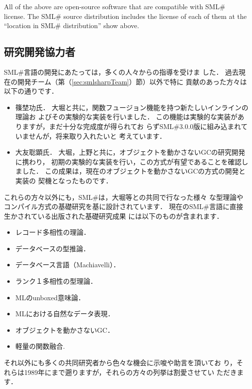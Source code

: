 \documentclass{jbook}
\newif\ifjp
\newcommand{\txt}[2]{#1}
\newcommand{\smlsharp}{SML\#}
\newcommand{\version}{3.0.0}
\begin{document}
	All of the above are open-source software that are compatible
with \smlsharp{} license.
	The \smlsharp{} source distribution includes the license of each
of them at the ``location in \smlsharp{} distribution'' show above.
\fi%

\subsection{\txt{研究開発協力者}{Collaborators}}

\ifjp%
	\smlsharp{}言語の開発にあたっては，多くの人々からの指導を受けま
した．
	過去現在の開発チーム（第（\ref{sec:smlsharpTeam}）節）以外で特に
貢献のあった方々は以下の通りです．
\begin{itemize}
\item 篠埜功氏．
	大堀と共に，関数フュージョン機能を持つ新たしいインラインの理論お
よびその実験的な実装を行いました．
	この機能は実験的な実装がありますが，まだ十分な完成度が得られてお
らず\smlsharp{}\version{}版に組み込まれていませんが，将来取り入れたいと
考えています．
\item 大友聡顕氏．
	大堀，上野と共に，オブジェクトを動かさないGCの研究開発に携わり，
初期の実験的な実装を行い，この方式が有望であることを確認しました．
	この成果は，現在のオブジェクトを動かさないGCの方式の開発と実装の
契機となったものです．
\end{itemize}
	これらの方々以外にも，\smlsharp{}は，大堀等との共同で行なった様々
な型理論やコンパイル方式の基礎研究を基に設計されています．
	現在の\smlsharp{}言語に直接生かされている出版された基礎研究成果
には以下のものが含まれます．
\begin{itemize}
\item レコード多相性の理論\cite{ohor92popl,ohor95toplas}．
\item データベースの型推論\cite{ohor88lfp}．
\item データベース言語（Machiavelli）\cite{ohor89sigmod,bune96tods}．
\item ランク１多相性の型理論\cite{ohor99icfp}．
\item MLのunboxed意味論\cite{ohor97unbox}．
\item MLにおける自然なデータ表現\cite{nguyen06ppdp}．
\item オブジェクトを動かさないGC\cite{ueno11icfp}．
\item 軽量の関数融合\cite{ohor07popl}.
\end{itemize}
	それ以外にも多くの共同研究者から色々な機会に示唆や助言を頂いてお
り，それらは1989年にまで遡りますが，それらの方々の列挙は割愛させてい
ただきます．
\else%
\end{document}
